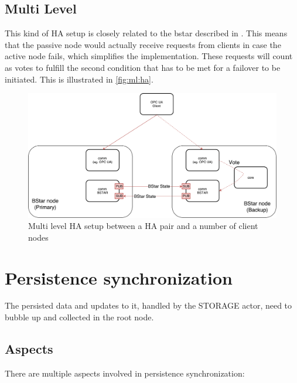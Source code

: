 \subsection{Multi Level}
This kind of \gls{HA} setup is closely related to the \gls{bstar} described
in \cite[Chapter 4 - Reliable Request-Reply Patterns, High-Availability Pair
(Binary Star Pattern)]{zmq:zguide}. This means that the passive node would
actually receive requests from clients in case the active node fails, which
simplifies the implementation. These requests will count as votes to fulfill
the second condition that has to be met for a failover to be initiated. This is
illustrated in \autoref{fig:ml:ha}.

\begin{figure}[]
	\includegraphics[width=\textwidth]{img/ML-HA_bstar.pdf}
	\caption{Multi level HA setup between a HA pair and a number of client nodes}
	\label{fig:ml:ha}
\end{figure}

\section{Persistence synchronization}\label{sec:approach:psync}
The persisted data and updates to it, handled by the STORAGE actor, need to
bubble up and collected in the root node.

\subsection{Aspects}
There are multiple aspects involved in persistence synchronization:

